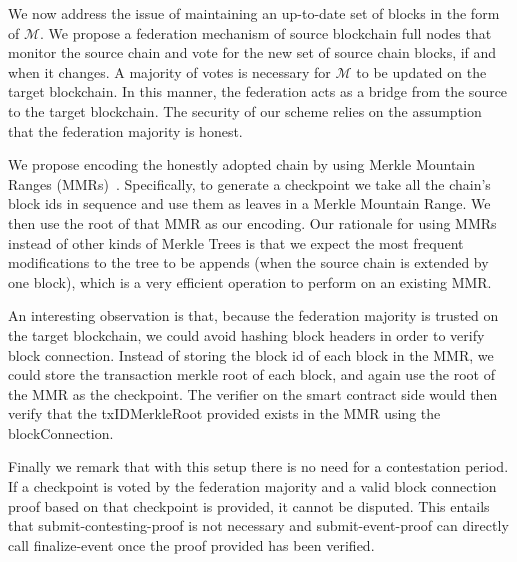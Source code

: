 We now address the issue of maintaining an up-to-date set of blocks in the form of $\mathcal{M}$. We propose a federation mechanism of source blockchain full nodes that monitor the source chain and vote for the new set of source chain blocks, if and when it changes. A majority of votes is necessary for $\mathcal{M}$ to be updated on the target blockchain. In this manner, the federation acts as a bridge from the source to the target blockchain. The security of our scheme relies on the assumption that the federation majority is honest.

We propose encoding the honestly adopted chain by using Merkle Mountain Ranges (MMRs)~\cite{flyclient}. Specifically, to generate a checkpoint we take all the chain's block ids in sequence and use them as leaves in a Merkle Mountain Range. We then use the root of that MMR as our encoding. Our rationale for using MMRs instead of other kinds of Merkle Trees is that we expect the most frequent modifications to the tree to be appends (when the source chain is extended by one block), which is a very efficient operation to perform on an existing MMR.

An interesting observation is that, because the federation majority is trusted on the target blockchain, we could avoid hashing block headers in order to verify block connection. Instead of storing the block id of each block in the MMR, we could store the transaction merkle root of each block, and again use the root of the MMR as the checkpoint. The verifier on the smart contract side would then verify that the \textsf{txIDMerkleRoot} provided exists in the MMR using the \textsf{blockConnection}.

Finally we remark that with this setup there is no need for a contestation period. If a checkpoint is voted by the federation majority and a valid block connection proof based on that checkpoint is provided, it cannot be disputed. This entails that \textsf{submit-contesting-proof} is not necessary and \textsf{submit-event-proof} can directly call \textsf{finalize-event} once the proof provided has been verified.
